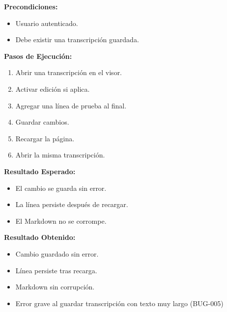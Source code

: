 \documentclass[12pt, a4paper]{article}
\newcommand{\prioChip}[2]{%
  \colorbox{#1}{\textcolor{white}{\footnotesize\textbf{#2}}}%
}
\newcommand{\statusChip}[2]{%
  \colorbox{#1}{\textcolor{white}{\footnotesize\textbf{#2}}}%
}
\begin{document}
\newpage

\begin{tcolorbox}[enhanced, breakable, colback=white, colframe=espe-blue,
  boxrule=1pt, arc=5pt,
  title={\textbf{CP-07} \enspace Editar y guardar una transcripci\'on \hfill \prioChip{media}{Media} \enspace \statusChip{falla-red}{FALLADO}},
  fonttitle=\color{white},
  attach boxed title to top left={yshift=-2mm,xshift=4mm},
  boxed title style={colback=espe-blue,arc=3pt}]
\begin{minipage}[t]{0.48\linewidth}
\textbf{Precondiciones:}
\begin{itemize}[noitemsep,topsep=2pt]
  \item Usuario autenticado.
  \item Debe existir una transcripci\'on guardada.
\end{itemize}
\textbf{Pasos de Ejecuci\'on:}
\begin{enumerate}[noitemsep,topsep=2pt]
  \item Abrir una transcripci\'on en el visor.
  \item Activar edici\'on si aplica.
  \item Agregar una l\'inea de prueba al final.
  \item Guardar cambios.
  \item Recargar la p\'agina.
  \item Abrir la misma transcripci\'on.
\end{enumerate}
\end{minipage}\hfill
\begin{minipage}[t]{0.48\linewidth}
\textbf{Resultado Esperado:}
\begin{itemize}[noitemsep,topsep=2pt]
  \item El cambio se guarda sin error.
  \item La l\'inea persiste despu\'es de recargar.
  \item El Markdown no se corrompe.
\end{itemize}
\vspace{4pt}
\textbf{Resultado Obtenido:}
\begin{itemize}[noitemsep,topsep=2pt]
  \item[$\checkmark$] Cambio guardado sin error.
  \item[$\checkmark$] L\'inea persiste tras recarga.
  \item[$\checkmark$] Markdown sin corrupci\'on.
  \item[$\times$] Error grave al guardar transcripci\'on con texto muy largo (BUG-005)
\end{itemize}
\end{minipage}
\end{tcolorbox}
\end{document}

